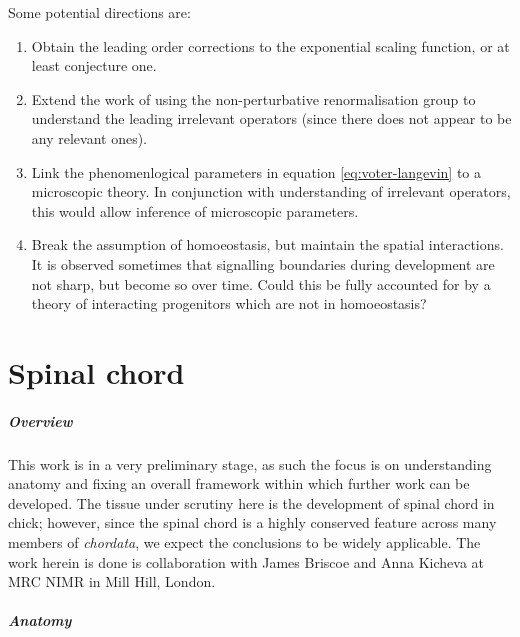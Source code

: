 \documentclass[10pt,english]{report}
\begin{document}
Some potential directions are:

\begin{enumerate}

\item Obtain the leading order corrections to the exponential scaling function, or at least conjecture one.

\item Extend the work of \citet{canet05} using the non-perturbative renormalisation group to understand the leading irrelevant operators (since there does not appear to be any relevant ones).

\item Link the phenomenlogical parameters in equation \eqref{eq:voter-langevin} to a microscopic theory. In conjunction with understanding of irrelevant operators, this would allow inference of microscopic parameters.

\item Break the assumption of homoeostasis, but maintain the spatial interactions. It is observed sometimes that signalling boundaries during development are not sharp, but become so over time. Could this be fully accounted for by a theory of interacting progenitors which are not in homoeostasis?

\end{enumerate}

\chapter{\label{ch:spinal-chord}Spinal chord}

\paragraph{Overview}

This work is in a very preliminary stage, as such the focus is on understanding anatomy and fixing an overall framework within which further work can be developed. The tissue under scrutiny here is the development of spinal chord in chick; however, since the spinal chord is a highly conserved feature across many members of \emph{chordata}, we expect the conclusions to be widely applicable. The work herein is done is collaboration with James Briscoe and Anna Kicheva at MRC NIMR in Mill Hill, London.

\paragraph{Anatomy}
\end{document}

